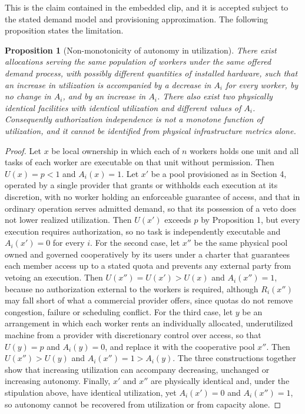 \documentclass[11pt]{article}
\theoremstyle{plain}
\newtheorem{proposition}{Proposition}
\theoremstyle{definition}
\begin{document}
This is the claim contained in the embedded clip, and it is accepted subject to the stated demand model and provisioning approximation. The following proposition states the limitation.

\begin{proposition}[Non-monotonicity of autonomy in utilization]
There exist allocations serving the same population of workers under the same offered demand process, with possibly different quantities of installed hardware, such that an increase in utilization is accompanied by a decrease in $A_i$ for every worker, by no change in $A_i$, and by an increase in $A_i$. There also exist two physically identical facilities with identical utilization and different values of $A_i$. Consequently authorization independence is not a monotone function of utilization, and it cannot be identified from physical infrastructure metrics alone.
\end{proposition}

\begin{proof}
Let $x$ be local ownership in which each of $n$ workers holds one unit and all tasks of each worker are executable on that unit without permission. Then $U(x)=p<1$ and $A_i(x)=1$. Let $x'$ be a pool provisioned as in Section 4, operated by a single provider that grants or withholds each execution at its discretion, with no worker holding an enforceable guarantee of access, and that in ordinary operation serves admitted demand, so that its possession of a veto does not lower realized utilization. Then $U(x')$ exceeds $p$ by Proposition 1, but every execution requires authorization, so no task is independently executable and $A_i(x')=0$ for every $i$. For the second case, let $x''$ be the same physical pool owned and governed cooperatively by its users under a charter that guarantees each member access up to a stated quota and prevents any external party from vetoing an execution. Then $U(x'')=U(x')>U(x)$ and $A_i(x'')=1$, because no authorization external to the workers is required, although $R_i(x'')$ may fall short of what a commercial provider offers, since quotas do not remove congestion, failure or scheduling conflict. For the third case, let $y$ be an arrangement in which each worker rents an individually allocated, underutilized machine from a provider with discretionary control over access, so that $U(y)=p$ and $A_i(y)=0$, and replace it with the cooperative pool $x''$. Then $U(x'')>U(y)$ and $A_i(x'')=1>A_i(y)$. The three constructions together show that increasing utilization can accompany decreasing, unchanged or increasing autonomy. Finally, $x'$ and $x''$ are physically identical and, under the stipulation above, have identical utilization, yet $A_i(x')=0$ and $A_i(x'')=1$, so autonomy cannot be recovered from utilization or from capacity alone. \qedhere
\end{proof}
\end{document}
